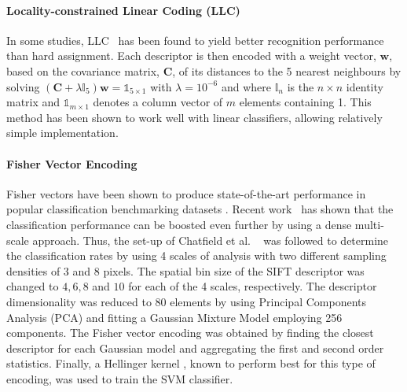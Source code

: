 \paragraph{Locality-constrained Linear Coding (LLC)} 
In some studies, LLC~\cite{Wang2010} has been found to yield better recognition performance than hard assignment. Each descriptor is then encoded with a weight vector, $\mathbf{w}$, based on the covariance matrix, $\mathbf{C}$, of its distances to the 5 nearest neighbours by solving $(\mathbf{C} + \lambda \mathbb{I}_{5})\mathbf{w} = \mathds{1}_{5\times 1}$ with $\lambda=10^{-6}$ and where $\mathbb{I}_n$ is the $n\times n$ identity matrix and $\mathds{1}_{m\times 1}$ denotes a column vector of $m$ elements containing 1. This method has been shown to work well with linear classifiers, allowing relatively simple implementation.
\paragraph{Fisher Vector Encoding} 
Fisher vectors have been shown to produce state-of-the-art performance in popular classification benchmarking datasets \cite{Chatfield2011}. Recent work~\cite{Perronnin2010} has shown that the classification performance can be boosted even further by using a dense multi-scale approach. Thus, the set-up of Chatfield et al. ~\cite{Chatfield2011} was followed to determine the classification rates by using 4 scales of analysis with two different sampling densities of 3 and 8 pixels. The spatial bin size of the SIFT descriptor was changed to $4,6,8$ and $10$ for each of the 4 scales, respectively. The descriptor dimensionality was reduced to 80 elements by using Principal Components Analysis (PCA) and fitting a Gaussian Mixture Model employing 256 components. The Fisher vector encoding was obtained by finding the closest descriptor for each Gaussian model and aggregating the first and second order statistics. Finally, a Hellinger kernel \cite{chatfield2011devil}, known to perform best for this type of encoding, was used to train the SVM classifier.

